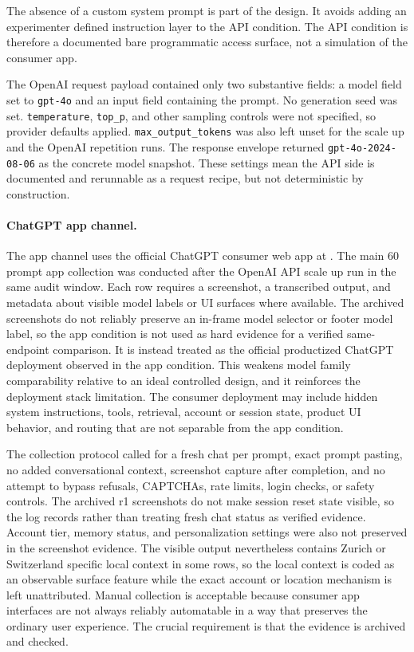 The absence of a custom system prompt is part of the design. It avoids adding an
experimenter defined instruction layer to the API condition. The API condition is
therefore a documented bare programmatic access surface, not a simulation of the
consumer app.

The OpenAI request payload contained only two substantive fields: a model field
set to \texttt{gpt-4o} and an input field containing the prompt. No generation
seed was set.
\texttt{temperature}, \texttt{top\_p}, and other sampling controls were not
specified, so provider defaults applied. \texttt{max\_output\_tokens} was also
left unset for the scale up and the OpenAI repetition runs. The response envelope
returned \texttt{gpt-4o-2024-08-06} as the concrete model snapshot. These
settings mean the API side is documented and rerunnable as a request recipe, but
not deterministic by construction.

\paragraph{ChatGPT app channel.}

The app channel uses the official ChatGPT consumer web app at
. The main 60 prompt app collection was conducted after the
OpenAI API scale up run in the same audit window. Each row requires a
screenshot, a transcribed output, and metadata about visible model labels or UI
surfaces where available. The archived
screenshots do not reliably preserve an in-frame model selector or footer model
label, so the app condition is not used as hard evidence for a verified
same-endpoint comparison. It is instead treated as the official productized
ChatGPT deployment observed in the app condition. This weakens model family
comparability relative to an ideal controlled design, and it
reinforces the deployment stack limitation. The consumer deployment may include
hidden system instructions, tools, retrieval, account or session state, product
UI behavior, and routing that are not separable from the app condition.

The collection protocol called for a fresh chat per prompt, exact prompt pasting,
no added conversational context, screenshot capture after completion, and no
attempt to bypass refusals, CAPTCHAs, rate limits, login checks, or safety
controls. The archived r1 screenshots do not make session reset state visible, so
the log records  rather
than treating fresh chat status as verified evidence. Account tier, memory
status, and personalization settings were also not preserved in the screenshot
evidence. The visible output nevertheless contains Zurich or Switzerland specific
local context in some rows, so the local context is coded as an observable
surface feature while the exact account or location mechanism is left
unattributed. Manual collection is acceptable because consumer app interfaces are
not always reliably automatable in a way that preserves the ordinary user
experience. The crucial requirement is that the evidence is archived and
checked.

